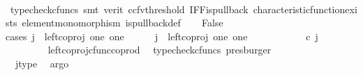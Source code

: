 \begin{isabellebody}
\ \ \ \ \isamarkupfalse%
\ {\isacharparenleft}{\kern0pt}typecheck{\isacharunderscore}{\kern0pt}cfuncs{\isacharcomma}{\kern0pt}\ smt\ {\isacharparenleft}{\kern0pt}verit{\isacharcomma}{\kern0pt}\ ccfv{\isacharunderscore}{\kern0pt}threshold{\isacharparenright}{\kern0pt}\ IFF{\isacharunderscore}{\kern0pt}is{\isacharunderscore}{\kern0pt}pullback\ characteristic{\isacharunderscore}{\kern0pt}function{\isacharunderscore}{\kern0pt}exists\ element{\isacharunderscore}{\kern0pt}monomorphism\ is{\isacharunderscore}{\kern0pt}pullback{\isacharunderscore}{\kern0pt}def{\isacharparenright}{\kern0pt}\isanewline
\ \ \isamarkupfalse%
\ False\isanewline
\ \ \isamarkupfalse%
{\isacharparenleft}{\kern0pt}cases\ {\isachardoublequoteopen}j\ {\isacharequal}{\kern0pt}\ left{\isacharunderscore}{\kern0pt}coproj\ one\ one{\isachardoublequoteclose}{\isacharparenright}{\kern0pt}\isanewline
\ \ \ \ \isamarkupfalse%
\ {\isachardoublequoteopen}j\ {\isacharequal}{\kern0pt}\ left{\isacharunderscore}{\kern0pt}coproj\ one\ one{\isachardoublequoteclose}\isanewline
\ \ \ \ \isamarkupfalse%
\ \isamarkupfalse%
\ {\isachardoublequoteopen}{\isacharparenleft}{\kern0pt}{\isasymlangle}{\isasymt}{\isacharcomma}{\kern0pt}\ {\isasymt}{\isasymrangle}\ {\isasymamalg}{\isasymlangle}{\isasymf}{\isacharcomma}{\kern0pt}\ {\isasymf}{\isasymrangle}{\isacharparenright}{\kern0pt}\ {\isasymcirc}\isactrlsub c\ j\ \ {\isacharequal}{\kern0pt}\ {\isasymlangle}{\isasymt}{\isacharcomma}{\kern0pt}\ {\isasymt}{\isasymrangle}{\isachardoublequoteclose}\isanewline
\ \ \ \ \ \ \isamarkupfalse%
\ \ left{\isacharunderscore}{\kern0pt}coproj{\isacharunderscore}{\kern0pt}cfunc{\isacharunderscore}{\kern0pt}coprod\ \isamarkupfalse%
\ {\isacharparenleft}{\kern0pt}typecheck{\isacharunderscore}{\kern0pt}cfuncs{\isacharcomma}{\kern0pt}\ presburger{\isacharparenright}{\kern0pt}\isanewline
\ \ \ \ \isamarkupfalse%
\ \isamarkupfalse%
\ {\isachardoublequoteopen}{\isasymlangle}{\isasymt}{\isacharcomma}{\kern0pt}\ {\isasymf}{\isasymrangle}\ {\isacharequal}{\kern0pt}\ {\isasymlangle}{\isasymt}{\isacharcomma}{\kern0pt}{\isasymt}{\isasymrangle}{\isachardoublequoteclose}\isanewline
\ \ \ \ \ \ \isamarkupfalse%
\ \ j{\isacharunderscore}{\kern0pt}type\ \isamarkupfalse%
\ argo\isanewline
\ \ \ \ \isamarkupfalse%
\ \isamarkupfalse%
\ {\isachardoublequoteopen}{\isasymt}\ {\isacharequal}{\kern0pt}\ {\isasymf}{\isachardoublequoteclose}\isanewline

\end{isabellebody}
